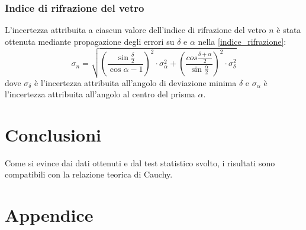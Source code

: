 \documentclass[]{article}
\let\oldsection\section%
\renewcommand{\section}{%
	\renewcommand{\theequation}{\thesection.\arabic{equation}}%
	\oldsection}%
\begin{document}
    \subsubsection{Indice di rifrazione del vetro}
    L'incertezza attribuita a ciascun valore dell'indice di rifrazione del vetro $n$ è stata ottenuta mediante propagazione degli errori su $\delta$ e $\alpha$ nella \ref{indice_rifrazione}:
    \begin{equation}
        \label{sigma-n}
        \sigma_n = \sqrt{ \left(\frac{\sin{\frac{\delta}{2}}}{\cos{\alpha}-1}\right)^2 \cdot \sigma_{\alpha}^2 + \left(\frac{cos{\frac{\delta + \alpha}{2}}}{\sin{\frac{\alpha}{2}}}\right)^2 \cdot \sigma_{\delta}^2   }
    \end{equation}
    dove $\sigma_{\delta}$ è l'incertezza attribuita all'angolo di deviazione minima $\delta$ e $\sigma_{\alpha}$ è l'incertezza attribuita all'angolo al centro del prisma $\alpha$.

    \section{Conclusioni}
    Come si evince dai dati ottenuti e dal test statistico svolto, i risultati sono compatibili con la relazione teorica di Cauchy.

    \newpage

    \section*{Appendice}
\end{document}
